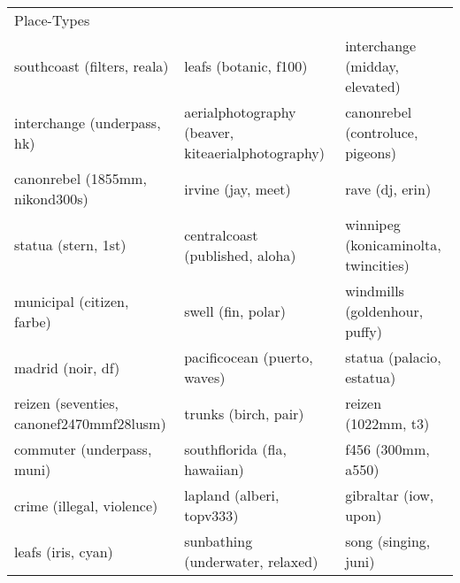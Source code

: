 \begin{table}[]
\begin{tabular}{lll}
		Place-Types                               &                                                   &                                                          \\
		southcoast (filters, reala)              & leafs (botanic, f100)                             & interchange (midday, elevated)                           \\
		interchange (underpass, hk)              & aerialphotography (beaver, kiteaerialphotography) & canonrebel (controluce, pigeons)                         \\
		canonrebel (1855mm, nikond300s)          & irvine (jay, meet)                                & rave (dj, erin)                                          \\
		statua (stern, 1st)                      & centralcoast (published, aloha)                   & winnipeg (konicaminolta, twincities)                     \\
		municipal (citizen, farbe)               & swell (fin, polar)                                & windmills (goldenhour, puffy)                            \\
		madrid (noir, df)                        & pacificocean (puerto, waves)                      & statua (palacio, estatua)                                \\
		reizen (seventies, canonef2470mmf28lusm) & trunks (birch, pair)                              & reizen (1022mm, t3)                                      \\
		commuter (underpass, muni)               & southflorida (fla, hawaiian)                      & f456 (300mm, a550)                                       \\
		crime (illegal, violence)                & lapland (alberi, topv333)                         & gibraltar (iow, upon)                                    \\
		leafs (iris, cyan)                       & sunbathing (underwater, relaxed)                  & song (singing, juni)                                     \\


\end{tabular}
\end{table}
